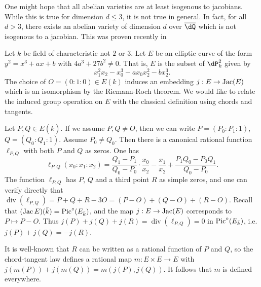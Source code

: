 One might hope that all abelian varieties are at least isogenous to jacobians. 
While this is true for dimension $d\leqslant 3$, it is not true in general. 
In fact, for all $d>3$, there exists an abelian variety of dimension $d$ over 
$\overline{\dQ}$ which is not isogenous to a jacobian. This was proven 
recently in \cite{ts12}

\begin{example}
Let $k$ be field of characteristic not $2$ or $3$. Let $E$ be an elliptic curve 
of the form $y^2=x^3+a x+b$ with $4 a^3+27 b^2\ne 0$. That is, $E$ is the 
subset of $\dP_k^2$ given by 
\[
  x_1^2 x_2 - x_0^3 - a x_0 x_2^2 - b x_2^3 \text{.}
\]
The choice of $O=(0:1:0)\in E(k)$ induces an embedding $j:E\to \operatorname{Jac}(E)$ which 
is an isomorphism by the Riemann-Roch theorem. We would like to relate the 
induced group operation on $E$ with the classical definition using chords and 
tangents. 

Let $P,Q\in E(\bar k)$. If we assume $P,Q\ne O$, then we can write 
$P=(P_0:P_1:1)$, $Q=(Q_0:Q_1:1)$. Assume $P_0\ne Q_0$. Then there is a 
canonical rational function $\ell_{P,Q}$ with both $P$ and $Q$ as zeros. One 
has  
\[
 \ell_{P,Q}(x_0:x_1:x_2) = \frac{Q_1-P_1}{Q_0-P_0} \cdot \frac{x_0}{x_2} - \frac{x_1}{x_2} + \frac{P_1 Q_0 - P_0 Q_1}{Q_0-P_0} \text{.}
\]
The function $\ell_{P,Q}$ has $P$, $Q$ and a third point $R$ as simple zeros, 
and one can verify directly that 
$\operatorname{div}(\ell_{P,Q})=P+Q+R-3 O = (P-O)+(Q-O)+(R-O)$. Recall that 
$(\operatorname{Jac} E)(\bar k)=\operatorname{Pic}^\circ(E_{\bar k})$, and the map $j:E\to \operatorname{Jac}(E)$ 
corresponds to $P\mapsto P-O$. Thus 
$j(P)+j(Q)+j(R)=\operatorname{div}(\ell_{P,Q})=0$ in 
$\operatorname{Pic}^\circ(E_{\bar k})$, i.e. $j(P)+j(Q)=-j(R)$. 

It is well-known that $R$ can be written as a rational function of $P$ and $Q$, 
so the chord-tangent law defines a rational map $m:E\times E\to E$ with 
$j(m(P))+j(m(Q))=m(j(P),j(Q))$. It follows that $m$ is defined everywhere. 
\end{example}








